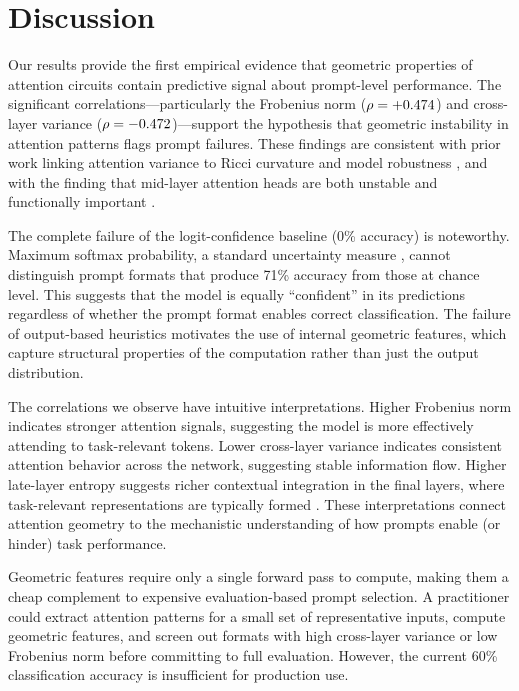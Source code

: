 \section{Discussion}
\label{sec:discussion}

Our results provide the first empirical evidence that geometric properties of attention circuits contain predictive signal about prompt-level performance.
The significant correlations---particularly the Frobenius norm ($\rho = +0.474$) and cross-layer variance ($\rho = -0.472$)---support the hypothesis that geometric instability in attention patterns flags prompt failures.
These findings are consistent with prior work linking attention variance to Ricci curvature and model robustness \citep{park2024geometry}, and with the finding that mid-layer attention heads are both unstable and functionally important \citep{bali2026quantifying}.

The complete failure of the logit-confidence baseline (0\% accuracy) is noteworthy.
Maximum softmax probability, a standard uncertainty measure \citep{hendrycks2017baseline}, cannot distinguish prompt formats that produce 71\% accuracy from those at chance level.
This suggests that the model is equally ``confident'' in its predictions regardless of whether the prompt format enables correct classification.
The failure of output-based heuristics motivates the use of internal geometric features, which capture structural properties of the computation rather than just the output distribution.

The correlations we observe have intuitive interpretations.
Higher Frobenius norm indicates stronger attention signals, suggesting the model is more effectively attending to task-relevant tokens.
Lower cross-layer variance indicates consistent attention behavior across the network, suggesting stable information flow.
Higher late-layer entropy suggests richer contextual integration in the final layers, where task-relevant representations are typically formed \citep{wang2022interpretability}.
These interpretations connect attention geometry to the mechanistic understanding of how prompts enable (or hinder) task performance.

Geometric features require only a single forward pass to compute, making them a cheap complement to expensive evaluation-based prompt selection.
A practitioner could extract attention patterns for a small set of representative inputs, compute geometric features, and screen out formats with high cross-layer variance or low Frobenius norm before committing to full evaluation.
However, the current 60\% classification accuracy is insufficient for production use.

